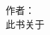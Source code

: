 \begin{titlepage}
  \raggedleft
  {\Large 作者：\pdfauthor\\[1in]}    
  {\large 此书关于\\}
  {\Huge\scshape \bookname\\[.2in]}      
  {\large \bookoneword\\}    
  \vfill
  {\itshape \timeandcompany} 
\end{titlepage}